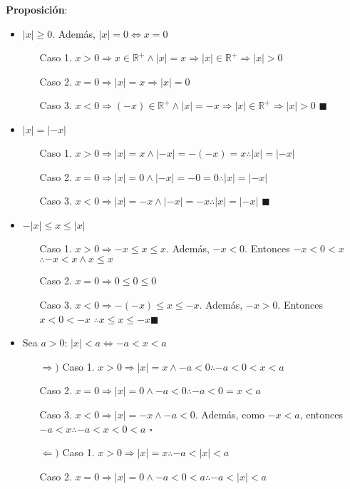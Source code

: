 \documentclass[11pt,a4paper]{article}
\newcommand*{\QEDA}{\null\nobreak\hfill\ensuremath{\blacksquare}}
\newcommand*{\QEDB}{\null\nobreak\hfill\ensuremath{\square}}
\begin{document}
\noindent \textbf{Proposici\'on}:
\begin{itemize}
\item $|x| \geq 0$. Adem\'as, $|x| = 0 \iff x = 0$
\begin{enumerate}
\item [Caso 1. ] $x>0 \Rightarrow x \in \mathbb{R}^+ \land |x| = x \Rightarrow |x| \in \mathbb{R}^+ \Rightarrow |x| > 0$
\item [Caso 2. ] $x=0 \Rightarrow |x| = x \Rightarrow |x| = 0$
\item [Caso 3. ] $x<0 \Rightarrow (-x) \in \mathbb{R}^+ \land |x| = -x \Rightarrow |x| \in \mathbb{R}^+ \Rightarrow |x| > 0$ \QEDA
\end{enumerate}
\item $|x| = |-x|$
\begin{enumerate}
\item [Caso 1. ] $x>0 \Rightarrow |x| = x \land |-x| = -(-x) = x \therefore |x| = |-x|$
\item [Caso 2. ] $x=0 \Rightarrow |x| = 0 \land |-x| = -0 = 0 \therefore |x| = |-x|$
\item [Caso 3. ] $x<0 \Rightarrow |x| = -x \land |-x| = -x \therefore |x| = |-x|$ \QEDA
\end{enumerate}
\item $-|x| \leq x \leq |x|$
\begin{enumerate}
\item [Caso 1. ] $x>0 \Rightarrow -x \leq x \leq x$. Adem\'as, $-x < 0$. Entonces $-x<0<x$ $\therefore -x < x \land x \leq x$
\item [Caso 2. ] $x=0 \Rightarrow 0 \leq 0 \leq 0$
\item [Caso 3. ] $x<0 \Rightarrow -(-x) \leq x \leq -x$. Adem\'as, $-x > 0$. Entonces $x < 0 < -x$ $\therefore x \leq x \leq -x$\QEDA
\end{enumerate}
\item Sea $a>0$: $|x| < a \iff -a < x < a$
\begin{enumerate}
\item [$\Rightarrow)$ Caso 1. ] $x>0 \Rightarrow |x| = x \land -a < 0 \therefore -a < 0 < x < a$
\item [Caso 2. ] $x=0 \Rightarrow |x| = 0 \land -a < 0 \therefore -a < 0 = x < a$
\item [Caso 3. ] $x<0 \Rightarrow |x| = -x \land -a < 0$. Adem\'as, como $-x < a$, entonces $-a < x \therefore -a < x < 0 < a$ \QEDB
\item [$\Leftarrow)$ Caso 1. ] $x>0 \Rightarrow |x| = x \therefore -a < |x| < a$
\item [Caso 2. ] $x=0 \Rightarrow |x| = 0 \land -a < 0 < a \therefore -a < |x| < a$

\end{enumerate}
\end{itemize}
\end{document}
